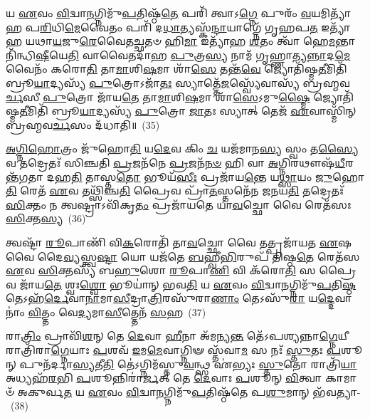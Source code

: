 𑌯 \ul{𑌏}\-𑌵𑌂 \ul{𑌵𑌿}\-𑌦𑍍𑌵𑌾\-\ul{𑌨}\-𑌗𑍍𑌨𑌿𑌮𑍁᳴\-\ul{𑌪}\-𑌤𑌿𑌷𑍍𑌠᳴\-\ul{𑌤𑍇} 𑌪𑌰𑌿᳴ 𑌤𑍍𑌵𑌾𑌽\-\ul{𑌗𑍍𑌨𑍇} 𑌪𑍁𑌰𑌂᳴ \ul{𑌵}\-𑌯𑌮𑌿𑌤𑍍𑌯𑌾᳴𑌹 𑌪\-\ul{𑌰𑌿}\-𑌧𑌿\-\ul{𑌮𑍇}\-𑌵𑍈𑌤𑌂 𑌪𑌰𑌿᳴ 𑌦\-\ul{𑌧𑌾}\-𑌤𑍍𑌯𑌸𑍍𑌕᳴\-\ul{𑌨𑍍𑌦𑌾}\-𑌯𑌾𑌗𑍍𑌨𑍇᳴ 𑌗𑍃𑌹𑌪\-\ul{𑌤} 𑌇𑌤𑍍𑌯𑌾᳴𑌹 𑌯𑌥𑌾\-\ul{𑌯}\-𑌜𑍁\-\ul{𑌰𑍇}\-𑌵𑍈𑌤\-\ul{𑌚𑍍𑌛}\-𑌤𑍞 𑌹𑌿\-\ul{𑌮𑌾} 𑌇𑌤𑍍𑌯𑌾᳴𑌹 \ul{𑌶}\-𑌤𑌂 𑌤𑍍𑌵𑌾᳴ 𑌹𑍇\-\ul{𑌮}\-𑌨𑍍𑌤𑌾𑌨𑌿᳴𑌨𑍍𑌧𑌿\-\ul{𑌷𑍀}\-𑌯𑍇\-\ul{𑌤𑌿} 𑌵𑌾𑌵𑍈𑌤𑌦𑌾᳴𑌹 \ul{𑌪𑍁}\-𑌤𑍍𑌰\-\ul{𑌸𑍍𑌯} 𑌨𑌾𑌮᳴ 𑌗𑍃𑌹𑍍𑌣𑌾𑌤𑍍𑌯\-\ul{𑌨𑍍𑌨𑌾}\-𑌦\-\ul{𑌮𑍇}\-𑌵𑍈𑌨𑌂᳴ 𑌕𑌰𑍋\-\ul{𑌤𑌿} 𑌤𑌾\-\ul{𑌮𑌾}\-𑌶𑌿\-\ul{𑌷}\-𑌮𑌾 𑌶𑌾᳴\-\ul{𑌸𑍇} 𑌤𑌨𑍍𑌤᳴\-\ul{𑌵𑍇} 𑌜𑍍𑌯𑍋𑌤𑌿᳴𑌷𑍍𑌮\-\ul{𑌤𑍀}\-𑌮𑌿𑌤𑌿᳴ 𑌬𑍍𑌰𑍂\-\ul{𑌯𑌾}\-𑌦𑍍𑌯𑌸𑍍𑌯᳴ \ul{𑌪𑍁}\-𑌤𑍍𑌰𑍋\-𑌽𑌜𑌾᳴\-\ul{𑌤𑌃} 𑌸𑍍𑌯𑌾𑌤𑍍𑌤𑍇᳴\-\ul{𑌜}\-𑌸𑍍𑌵𑍍𑌯𑍇᳴𑌵𑌾𑌸𑍍𑌯᳴ 𑌬𑍍𑌰𑌹𑍍𑌮𑌵\-\ul{𑌰𑍍𑌚}\-𑌸𑍀 \ul{𑌪𑍁}\-𑌤𑍍𑌰𑍋 𑌜𑌾᳴𑌯\-\ul{𑌤𑍇} 𑌤𑌾\-\ul{𑌮𑌾}\-𑌶𑌿\-\ul{𑌷}\-𑌮𑌾 𑌶𑌾᳴\-\ul{𑌸𑍇}\-\-𑌽𑌮𑍁\-\ul{𑌷𑍍𑌮𑍈} 𑌜𑍍𑌯𑍋𑌤𑌿᳴𑌷𑍍𑌮\-\ul{𑌤𑍀}\-𑌮𑌿𑌤𑌿᳴ 𑌬𑍍𑌰𑍂\-\ul{𑌯𑌾}\-𑌦𑍍𑌯𑌸𑍍𑌯᳴ \ul{𑌪𑍁}\-𑌤𑍍𑌰𑍋 \ul{𑌜𑌾}\-𑌤𑌃 𑌸𑍍𑌯𑌾𑌤𑍍 𑌤𑍇𑌜᳴ \ul{𑌏}\-𑌵𑌾𑌸𑍍𑌮𑌿᳴𑌨𑍍 𑌬𑍍𑌰𑌹𑍍𑌮𑌵\-\ul{𑌰𑍍𑌚}\-𑌸𑌂 𑌦᳴𑌧𑌾𑌤𑌿॥~(35)

{\anuvakamend[{𑌊𑌰𑍍𑌜𑌂᳴ 𑌵𑍋 𑌭\-\ul{𑌕𑍍𑌷𑍀}\-𑌯𑍇\-\ul{𑌤𑌿} 𑌪𑍍𑌰 𑌗𑌾𑌰𑍍\mbox{}𑌹᳴𑌪𑌤𑍍𑌯𑌮𑍁\-\ul{𑌪}\-𑌤𑌿𑌷𑍍𑌠᳴𑌤𑍇 𑌵𑌸\-\ul{𑌤𑌿} 𑌜𑍍𑌯𑍋𑌤𑌿᳴𑌷𑍍𑌮\-\ul{𑌤𑍀}\-𑌮𑍇\-\ul{𑌕𑌾}\-𑌨𑍍𑌨\-\ul{𑌤𑍍𑌰𑌿}\-\-\ul{𑍞}\-𑌶𑌚𑍍𑌚᳴}]}%

\-\ul{𑌅}\-\-\ul{𑌗𑍍𑌨𑌿}\-\-\ul{𑌹𑍋}\-𑌤𑍍𑌰𑌂 𑌜𑍁᳴𑌹𑍋\-\ul{𑌤𑌿} 𑌯\-\ul{𑌦𑍇}\-𑌵 𑌕𑌿𑌂 \ul{𑌚} 𑌯𑌜᳴𑌮𑌾𑌨\-\ul{𑌸𑍍𑌯} 𑌸𑍍𑌵𑌂 𑌤\-\ul{𑌸𑍍𑌯𑍈}\-𑌵 𑌤𑌦𑍍𑌰𑍇𑌤𑌃᳴ 𑌸𑌿𑌞𑍍𑌚𑌤𑌿 \ul{𑌪𑍍𑌰}\-𑌜𑌨᳴𑌨𑍇 \ul{𑌪𑍍𑌰}\-𑌜𑌨᳴\-\ul{𑌨}\-\-\ul{𑍞} 𑌹𑌿 𑌵𑌾 \ul{𑌅}\-𑌗𑍍𑌨𑌿𑌰𑌥𑍗𑌷᳴\-\ul{𑌧𑍀}\-𑌰𑌨𑍍𑌤᳴𑌗𑌤𑌾 𑌦𑌹\-\ul{𑌤𑌿} 𑌤𑌾𑌸𑍍𑌤\-\ul{𑌤𑍋} 𑌭𑍂𑌯᳴\-\ul{𑌸𑍀𑌃} 𑌪𑍍𑌰𑌜𑌾᳴𑌯\-\ul{𑌨𑍍𑌤𑍇} 𑌯\-\ul{𑌥𑍍𑌸𑌾}\-𑌯𑌂 \ul{𑌜𑍁}\-𑌹𑍋\-\ul{𑌤𑌿} 𑌰𑍇𑌤᳴ \ul{𑌏}\-𑌵 𑌤𑌥𑍍𑌸𑌿᳴𑌞𑍍𑌚\-\ul{𑌤𑌿} 𑌪𑍍𑌰𑍈𑌵 𑌪𑍍𑌰𑌾᳴\-\ul{𑌤}\-𑌸𑍍𑌤𑌨𑍇᳴𑌨 𑌜𑌨𑌯\-\ul{𑌤𑌿} 𑌤𑌦𑍍𑌰𑍇𑌤𑌃᳴ \ul{𑌸𑌿}\-𑌕𑍍𑌤𑌂 𑌨 𑌤𑍍𑌵𑌷𑍍𑌟𑍍𑌰𑌾\-𑌽𑌵𑌿᳴𑌕𑍃\-\ul{𑌤𑌂} 𑌪𑍍𑌰𑌜𑌾᳴𑌯𑌤𑍇 𑌯𑌾\-\ul{𑌵}\-𑌚𑍍𑌛𑍋 𑌵𑍈 𑌰𑍇𑌤᳴𑌸𑌃 \ul{𑌸𑌿}\-𑌕𑍍𑌤\-\ul{𑌸𑍍𑌯}\-~(36)

𑌤𑍍𑌵𑌷𑍍𑌟𑌾᳴ \ul{𑌰𑍂}\-𑌪𑌾𑌣𑌿᳴ 𑌵𑌿\-\ul{𑌕}\-𑌰𑍋𑌤𑌿᳴ 𑌤𑌾\-\ul{𑌵}\-𑌚𑍍𑌛𑍋 𑌵𑍈 𑌤𑌤𑍍𑌪𑍍𑌰𑌜𑌾᳴𑌯𑌤 \ul{𑌏}\-𑌷 𑌵𑍈 𑌦𑍈\-\ul{𑌵𑍍𑌯}\-𑌸𑍍𑌤𑍍𑌵\-\ul{𑌷𑍍𑌟𑌾} 𑌯𑍋 𑌯𑌜᳴𑌤𑍇 \ul{𑌬}\-𑌹𑍍𑌵𑍀\-\ul{𑌭𑌿}\-𑌰𑍁𑌪᳴ 𑌤𑌿𑌷𑍍𑌠\-\ul{𑌤𑍇} 𑌰𑍇𑌤᳴𑌸 \ul{𑌏}\-𑌵 \ul{𑌸𑌿}\-𑌕𑍍𑌤𑌸𑍍𑌯᳴ 𑌬\-\ul{𑌹𑍁}\-𑌶𑍋 \ul{𑌰𑍂}\-𑌪𑌾\-\ul{𑌣𑌿} 𑌵𑌿 𑌕᳴𑌰𑍋\-\ul{𑌤𑌿} 𑌸 𑌪𑍍𑌰𑍈𑌵 𑌜𑌾᳴𑌯\-\ul{𑌤𑍇} 𑌶𑍍𑌵𑌃\-\ul{𑌶𑍍𑌵𑍋} 𑌭𑍂𑌯𑌾॑𑌨𑍍 𑌭𑌵\-\ul{𑌤𑌿} 𑌯 \ul{𑌏}\-𑌵𑌂 \ul{𑌵𑌿}\-𑌦𑍍𑌵𑌾\-\ul{𑌨}\-𑌗𑍍𑌨𑌿𑌮𑍁᳴\-\ul{𑌪}\-𑌤𑌿\-\ul{𑌷𑍍𑌠}\-𑌤𑍇\-𑌽𑌹᳴\-\ul{𑌰𑍍𑌦𑍇}\-𑌵𑌾\-\ul{𑌨𑌾}\-𑌮𑌾\-\ul{𑌸𑍀}\-𑌦𑍍𑌰𑌾\-\ul{𑌤𑍍𑌰𑌿}\-𑌰𑌸𑍁᳴𑌰𑌾\-\ul{𑌣𑌾𑌂} 𑌤𑍇\-𑌽𑌸𑍁᳴\-\ul{𑌰𑌾} 𑌯\-\ul{𑌦𑍍𑌦𑍇}\-𑌵𑌾𑌨𑌾𑌂॑ \ul{𑌵𑌿}\-𑌤𑍍𑌤𑌂 𑌵𑍇\-\ul{𑌦𑍍𑌯}\-𑌮𑌾\-\ul{𑌸𑍀}\-𑌤𑍍𑌤𑍇𑌨᳴ \ul{𑌸}\-𑌹~(37)

𑌰𑌾\-\ul{𑌤𑍍𑌰𑌿𑌂} 𑌪𑍍𑌰𑌾𑌵𑌿᳴\-\ul{𑌶}\-𑌨𑍍 𑌤𑍇 \ul{𑌦𑍇}\-𑌵𑌾 \ul{𑌹𑍀}\-𑌨𑌾 𑌅᳴𑌮𑌨𑍍𑌯\-\ul{𑌨𑍍𑌤} 𑌤𑍇᳴\-𑌽𑌪𑌶𑍍𑌯𑌨𑍍𑌨𑌾\-\ul{𑌗𑍍𑌨𑍇}\-𑌯𑍀 𑌰𑌾𑌤𑍍𑌰𑌿᳴𑌰𑌾\-\ul{𑌗𑍍𑌨𑍇}\-𑌯𑌾𑌃 \ul{𑌪}\-𑌶𑌵᳴ \ul{𑌇}\-𑌮\-\ul{𑌮𑍇}\-𑌵𑌾𑌗𑍍𑌨𑌿𑍟 𑌸𑍍𑌤᳴𑌵𑌾\-\ul{𑌮} 𑌸 𑌨𑌃᳴ \ul{𑌸𑍍𑌤𑍁}\-𑌤𑌃 \ul{𑌪}\-𑌶𑍂𑌨𑍍 𑌪𑍁𑌨᳴𑌰𑍍𑌦𑌾\-\ul{𑌸𑍍𑌯}\-𑌤𑍀\-\ul{𑌤𑌿} 𑌤𑍇॑\-𑌽𑌗𑍍𑌨𑌿𑌮᳴𑌸𑍍𑌤𑍁\-\ul{𑌵}\-𑌨𑍍𑌥𑍍𑌸 𑌏॑𑌭𑍍𑌯𑌃 \ul{𑌸𑍍𑌤𑍁}\-𑌤𑍋 𑌰𑌾𑌤𑍍𑌰𑌿᳴\-\ul{𑌯𑌾} 𑌅𑌧𑍍𑌯𑌹᳴\-\ul{𑌰}\-𑌭𑌿 \ul{𑌪}\-𑌶𑍂𑌨𑍍𑌨𑌿𑌰𑌾॑\-\ul{𑌰𑍍𑌜}\-𑌤𑍍 𑌤𑍇 \ul{𑌦𑍇}\-𑌵𑌾𑌃 \ul{𑌪}\-𑌶𑍂𑌨𑍍 \ul{𑌵𑌿}\-𑌤𑍍𑌵𑌾 𑌕𑌾𑌮𑌾𑍞᳴ 𑌅𑌕𑍁𑌰𑍍𑌵\-\ul{𑌤} 𑌯 \ul{𑌏}\-𑌵𑌂 \ul{𑌵𑌿}\-𑌦𑍍𑌵𑌾\-\ul{𑌨}\-𑌗𑍍𑌨𑌿𑌮𑍁᳴\-\ul{𑌪}\-𑌤𑌿𑌷𑍍𑌠᳴𑌤𑍇 𑌪\-\ul{𑌶𑍁}\-𑌮𑌾𑌨𑍍 𑌭᳴𑌵𑌤𑍍𑌯𑌾-~(38)

